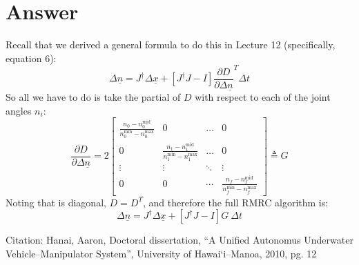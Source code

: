 \documentclass[]{article}
\begin{document}
\section{Answer}
Recall that we derived a general formula to do this in Lecture 12 (specifically, equation 6):
\begin{displaymath}
\Delta\underline{n} = J^{\dag}\Delta\underline{x} + \left[ J^{\dag}J-I\right] \frac{\partial D}{\partial \Delta\underline{n}}^{T}\Delta t
\end{displaymath}
So all we have to do is take the partial of $D$ with respect to each of the joint angles $n_{i}$:
\begin{displaymath}
	\frac{\partial D}{\partial \Delta\underline{n}} = 2\left[
		\begin{matrix}
			\frac{n_{0} - n_{0}^{\mathrm{mid}}}{n_{0}^{\mathrm{min}} - n_{0}^{\mathrm{max}}} & 0 & \dots & 0 \\
			0 & \frac{n_{1} - n_{1}^{\mathrm{mid}}}{n_{1}^{\mathrm{min}} - n_{1}^{\mathrm{max}}} & \dots & 0 \\
			\vdots & \vdots & \ddots & \vdots \\
			0 & 0 & \cdots & \frac{n_{f} - n_{f}^{\mathrm{mid}}}{n_{f}^{\mathrm{min}} - n_{f}^{\mathrm{max}}}
		\end{matrix} \right] \triangleq G
\end{displaymath}
Noting that is diagonal, $D=D^{T}$, and therefore the full RMRC algorithm is:
\begin{displaymath}
\Delta\underline{n} = J^{\dag}\Delta\underline{x} + \left[ J^{\dag}J-I\right]G\ \Delta t
\end{displaymath}

Citation: Hanai, Aaron, Doctoral dissertation, ``A Unified Autonomus Underwater Vehicle--Manipulator System'', University of Hawai`i--Manoa, 2010, pg. 12
\end{document}
